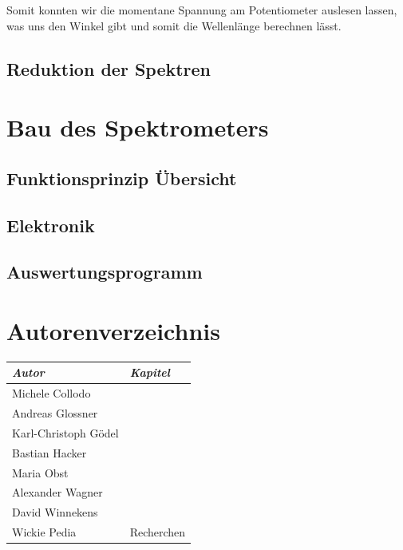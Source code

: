 \documentclass[11pt]{scrartcl}
\begin{document}
Somit konnten wir die momentane Spannung am Potentiometer auslesen lassen, was uns den Winkel gibt und somit die Wellenlänge berechnen lässt.


\subsection{Reduktion der Spektren}





\section{Bau des Spektrometers}
\subsection{Funktionsprinzip Übersicht}

\subsection{Elektronik}

\subsection{Auswertungsprogramm}



\newpage
\section{Autorenverzeichnis}
\begin{tabular}{|l|l|}
\hline
\emph{Autor} & \emph{Kapitel}\\
\hline
Michele Collodo & \\
Andreas Glossner & \\
Karl-Christoph G\"odel & \\
Bastian Hacker & \\
Maria Obst & \\
Alexander Wagner & \\
David Winnekens &  \\
Wickie Pedia & Recherchen \\
\hline
\end{tabular}
\end{document}
